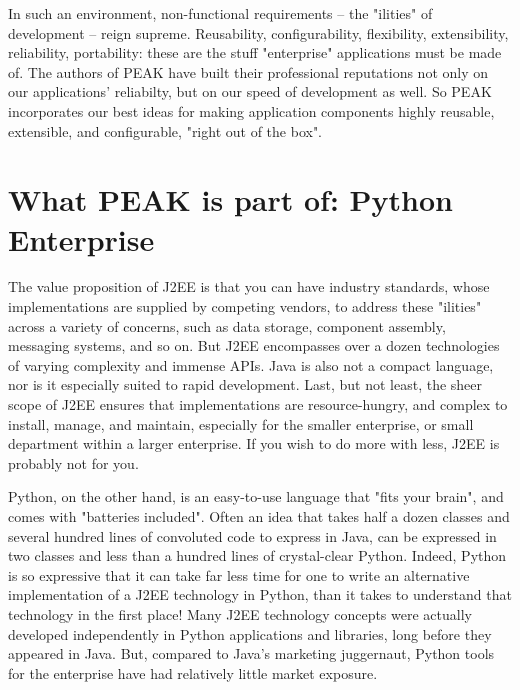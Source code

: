 In such an environment, non-functional requirements -- the "ilities" of
development -- reign supreme. Reusability, configurability, flexibility,
extensibility, reliability, portability: these are the stuff
"enterprise" applications must be made of. The authors of PEAK have
built their professional reputations not only on our applications'
reliabilty, but on our speed of development as well. So PEAK
incorporates our best ideas for making application components highly
reusable, extensible, and configurable, "right out of the box". 


\section{What PEAK is part of: Python Enterprise} 

The value proposition of J2EE is that you can have industry standards,
whose implementations are supplied by competing vendors, to address
these "ilities" across a variety of concerns, such as data storage,
component assembly, messaging systems, and so on. But J2EE encompasses
over a dozen technologies of varying complexity and immense APIs. Java
is also not a compact language, nor is it especially suited to rapid
development. Last, but not least, the sheer scope of J2EE ensures that
implementations are resource-hungry, and complex to install, manage, and
maintain, especially for the smaller enterprise, or small department
within a larger enterprise. If you wish to do more with less, J2EE is
probably not for you. 

Python, on the other hand, is an easy-to-use language that "fits your
brain", and comes with "batteries included". Often an idea that takes
half a dozen classes and several hundred lines of convoluted code to
express in Java, can be expressed in two classes and less than a hundred
lines of crystal-clear Python. Indeed, Python is so expressive that it
can take far less time for one to write an alternative implementation of
a J2EE technology in Python, than it takes to understand that technology
in the first place! Many J2EE technology concepts were actually
developed independently in Python applications and libraries, long
before they appeared in Java. But, compared to Java's marketing
juggernaut, Python tools for the enterprise have had relatively little
market exposure. 

